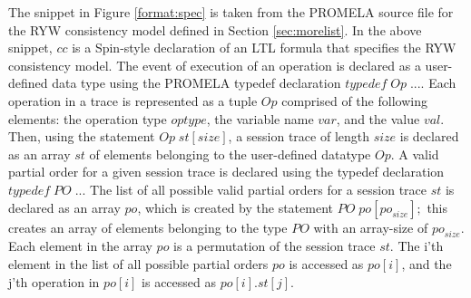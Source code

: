 \documentclass[conference]{IEEEtran}
\begin{document}
	\par %
	The snippet in Figure \ref{format:spec} is taken from the PROMELA  source file for the RYW consistency model defined in Section \ref{sec:morelist}. In the above snippet, $\mathit{cc}$ is a Spin-style declaration of an LTL formula that specifies the RYW consistency model. 
	The event of execution of an operation is declared as a user-defined data type using the PROMELA typedef declaration  $\mathit{typedef}\; \mathit{Op}\; ...$. 
	Each operation in a trace is represented as a tuple  $\mathit{Op}$ comprised of the following elements: the operation type $\mathit{optype}$, the variable name $\mathit{var}$, and the value $\mathit{val}$.  Then, using the statement $\mathit{Op} \; \mathit{st}[\mathit{size}]$, a session trace of length $\mathit{size}$ is declared as an array $\mathit{st} $ of elements belonging to the user-defined datatype $\mathit{Op}$.   A valid partial order for a given session trace is declared using the typedef declaration $\mathit{typedef}\; \mathit{PO}\; ...$  The list of all possible valid partial orders for a session trace $\mathit{st}$ is declared as an array $\mathit{po}$, which is created by the statement $\mathit{PO}\; \mathit{po}[\mathit{po}_\mathit{size}];$ this creates an array of elements belonging to the type $\mathit{PO}$ with an  array-size of $\mathit{po}_\mathit{size}$. Each element in the array $\mathit{po}$ is a permutation of the session trace $\mathit{st}$. The i'th element in the list of all possible partial orders $\mathit{po}$ is accessed as $\mathit{po}[i]$, and the j'th operation in $\mathit{po}[i]$ is accessed as $\mathit{po}[i].\mathit{st}[j]$. 
\end{document}
